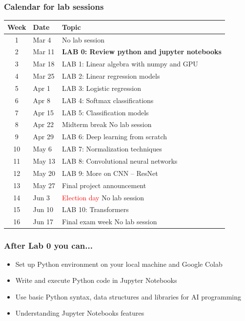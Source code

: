 \begin{frame}
    \frametitle{Calendar for lab sessions}

    \begin{table}[]
        \begin{tabular}{|c|l|l|}
            \hline
            Week & Date & Topic \\
            \hline
            1 & Mar 4 & No lab session \\
            2 & Mar 11 & \textbf{LAB 0: Review python and jupyter notebooks} \\
            3 & Mar 18 & LAB 1: Linear algebra with numpy and GPU \\
            4 & Mar 25 & LAB 2: Linear regression models \\
            5 & Apr 1 & LAB 3: Logistic regression \\
            6 & Apr 8 & LAB 4: Softmax classifications \\
            7 & Apr 15 & LAB 5: Classification models \\
            8 & Apr 22 & \textcolor{unistemerald}{Midterm break} No lab session \\
            \hline
            9 & Apr 29 & LAB 6: Deep learning from scratch \\
            10 & May 6 & LAB 7: Normalization techniques \\
            11 & May 13 & LAB 8: Convolutional neural networks \\
            12 & May 20 & LAB 9: More on CNN -- ResNet \\
            13 & May 27 & Final project announcement \\
            14 & Jun 3 & \textcolor{red}{Election day} No lab session \\
            15 & Jun 10 & LAB 10: Transformers \\
            16 & Jun 17 & \textcolor{unistemerald}{Final exam week} No lab session \\
            \hline
        \end{tabular}
    \end{table}
\end{frame}

\begin{frame}
  \frametitle{After Lab 0 you can...}
  \begin{itemize}
    \item Set up Python environment on your local machine and Google Colab
    \item Write and execute Python code in Jupyter Notebooks
    \item Use basic Python syntax, data structures and libraries for AI programming
    \item Understanding Jupyter Notebooks features
  \end{itemize}
\end{frame}